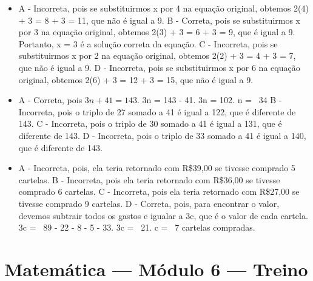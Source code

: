 \begin{itemize}
\item A - Incorreta, pois se substituirmos x por 4 na equação original,
obtemos 2(4) + 3 = 8 + 3 = 11, que não é igual a 9.
B - Correta, pois se substituirmos x por 3 na equação original, obtemos
2(3) + 3 = 6 + 3 = 9, que é igual a 9. Portanto, x = 3 é a solução
correta da equação.
C - Incorreta, pois se substituirmos x por 2 na equação original,
obtemos 2(2) + 3 = 4 + 3 = 7, que não é igual a 9.
D - Incorreta, pois se substituirmos x por 6 na equação original,
obtemos 2(6) + 3 = 12 + 3 = 15, que não é igual a 9.
\item A - Correta, pois \(3n + 41 = 143\). 3n = 143 - 41. 3n = 102. n = \ 34
B - Incorreta, pois o triplo de 27 somado a 41 é igual a 122, que é
diferente de 143.
C - Incorreta, pois o triplo de 30 somado a 41 é igual a 131, que é
diferente de 143.
D - Incorreta, pois o triplo de 33 somado a 41 é igual a 140, que é
diferente de 143.
\item A - Incorreta, pois, ela teria retornado com R\$39,00 se tivesse
comprado 5 cartelas.
B - Incorreta, pois ela teria retornado com R\$36,00 se tivesse comprado
6 cartelas.
C - Incorreta, pois ela teria retornado com R\$27,00 se tivesse comprado
9 cartelas.
D - Correta, pois, para encontrar o valor, devemos subtrair todos os
gastos e igualar a 3c, que é o valor de cada cartela. 3c = \ 89 - 22 - 8 - 5 - 33. 3c = \ 21. c = \ 7 cartelas compradas.
\end{itemize}

\section*{Matemática — Módulo 6 — Treino}

